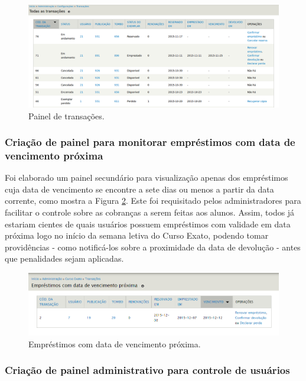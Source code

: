 \documentclass[a4paper]{article}
\begin{document}
\begin{figure}[pbth!]
\centering
\includegraphics[width=140mm, trim={35mm 0 30mm 20mm}, clip]{img/transactions.png}
\caption{Painel de transações.\label{transactions}}
\end{figure}

\subsubsection{Criação de painel para monitorar empréstimos com data de vencimento próxima}

Foi elaborado um painel secundário para visualização apenas dos empréstimos cuja data de vencimento se encontre a sete dias ou menos a partir da data corrente, como mostra a Figura \ref{expiring-soon}. Este foi requisitado pelos administradores para facilitar o controle sobre as cobranças a serem feitas aos alunos. Assim, todos já estariam cientes de quais usuários possuem empréstimos com validade em data próxima logo no início da semana letiva do Curso Exato, podendo tomar providências - como notificá-los sobre a proximidade da data de devolução - antes que penalidades sejam aplicadas.

\begin{figure}[pbth!]
\centering
\includegraphics[width=150mm]{img/expiring-soon.png}
\caption{Empréstimos com data de vencimento próxima.\label{expiring-soon}}
\end{figure}

\subsubsection{Criação de painel administrativo para controle de usuários}
\end{document}

